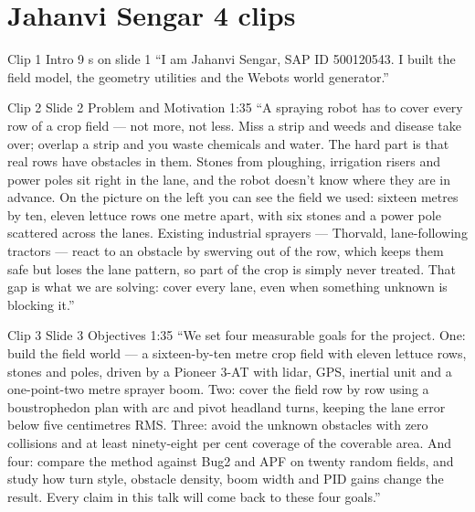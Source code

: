 \documentclass[11pt,a4paper]{article}
\begin{document}
\vspace{4pt}

\section*{\color{brand}Jahanvi Sengar \textbullet{} 4 clips}

\begin{clipbox}{Clip 1 \textbullet{} Intro \textbullet{} 9 s \textbullet{} on slide 1}
``I am Jahanvi Sengar, SAP ID 500120543. I built the field model, the geometry utilities and the Webots world generator.''
\end{clipbox}

\begin{clipbox}{Clip 2 \textbullet{} Slide 2 Problem and Motivation \textbullet{} 1:35}
``A spraying robot has to cover every row of a crop field --- not more, not less. Miss a strip and weeds and disease take over; overlap a strip and you waste chemicals and water. The hard part is that real rows have obstacles in them. Stones from ploughing, irrigation risers and power poles sit right in the lane, and the robot doesn't know where they are in advance. On the picture on the left you can see the field we used: sixteen metres by ten, eleven lettuce rows one metre apart, with six stones and a power pole scattered across the lanes. Existing industrial sprayers --- Thorvald, lane-following tractors --- react to an obstacle by swerving out of the row, which keeps them safe but loses the lane pattern, so part of the crop is simply never treated. That gap is what we are solving: cover every lane, even when something unknown is blocking it.''
\end{clipbox}

\begin{clipbox}{Clip 3 \textbullet{} Slide 3 Objectives \textbullet{} 1:35}
``We set four measurable goals for the project. One: build the field world --- a sixteen-by-ten metre crop field with eleven lettuce rows, stones and poles, driven by a Pioneer 3-AT with lidar, GPS, inertial unit and a one-point-two metre sprayer boom. Two: cover the field row by row using a boustrophedon plan with arc and pivot headland turns, keeping the lane error below five centimetres RMS. Three: avoid the unknown obstacles with zero collisions and at least ninety-eight per cent coverage of the coverable area. And four: compare the method against Bug2 and APF on twenty random fields, and study how turn style, obstacle density, boom width and PID gains change the result. Every claim in this talk will come back to these four goals.''
\end{clipbox}
\end{document}
